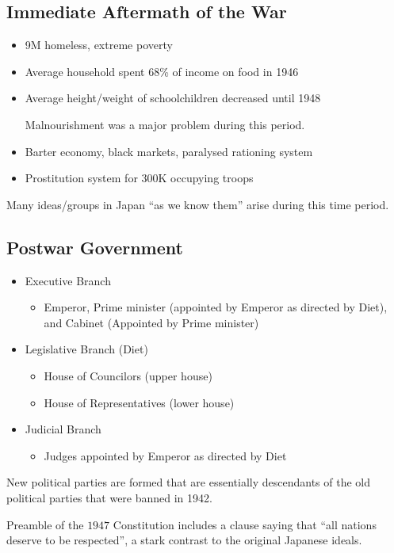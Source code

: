 \documentclass[class=article, crop=false]{standalone}
\begin{document}
  \subsection{Immediate Aftermath of the War}
  \begin{itemize}
    \item 9M homeless, extreme poverty
    \item Average household spent 68\% of income on food in 1946
    \item Average height/weight of schoolchildren decreased until 1948
    \begin{note}{}
      Malnourishment was a major problem during this period.
    \end{note}
    \item Barter economy, black markets, paralysed rationing system
    \item Prostitution system for 300K occupying troops
  \end{itemize}
  \begin{note}{}
    Many ideas/groups in Japan ``as we know them'' arise during this time period.
  \end{note}
  \subsection{Postwar Government}
  \begin{itemize}
    \item Executive Branch
    \begin{itemize}
      \item Emperor, Prime minister (appointed by Emperor as directed by Diet), and Cabinet (Appointed by Prime minister)
    \end{itemize}
    \item Legislative Branch (Diet)
    \begin{itemize}
      \item House of Councilors (upper house)
      \item House of Representatives (lower house)
    \end{itemize}
    \item Judicial Branch
    \begin{itemize}
      \item Judges appointed by Emperor as directed by Diet
    \end{itemize}
  \end{itemize}
  New political parties are formed that are essentially descendants of the old political parties that were banned in 1942.
  \begin{note}{}
    Preamble of the $1947$ Constitution includes a clause saying that ``all nations deserve to be respected'', a stark contrast to the original Japanese ideals.
  \end{note}
\end{document}
